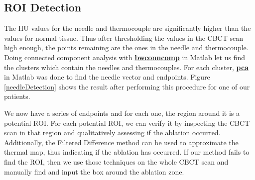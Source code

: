 \documentclass[]{spie}  %
\begin{document}
\subsection{ROI Detection}

The HU values for the needle and thermocouple are significantly higher than the values for normal tissue. Thus after thresholding the values in the CBCT scan high enough, the points remaining are the ones in the needle and thermocouple. Doing connected component analysis with \textbf{\href{http://www.mathworks.com/help/images/ref/bwconncomp.html}{bwconncomp}} \cite{bwconncomp} in Matlab let us find the clusters which contain the needles and thermocouples. For each cluster, \textbf{\href{http://www.mathworks.com/help/stats/pca.html}{pca}} \cite{pca} in Matlab was done to find the needle vector and endpoints. Figure \ref{needleDetection} shows the result after performing this procedure for one of our patients.

We now have a series of endpoints and for each one, the region around it is a potential ROI. For each potential ROI, we can verify it by inspecting the CBCT scan in that region and qualitatively assessing if the ablation occurred. Additionally, the Filtered Difference method can be used to approximate the thermal map, thus indicating if the ablation has occurred. If our method fails to find the ROI, then we use those techniques on the whole CBCT scan and manually find and input the box around the ablation zone. 
\end{document}
